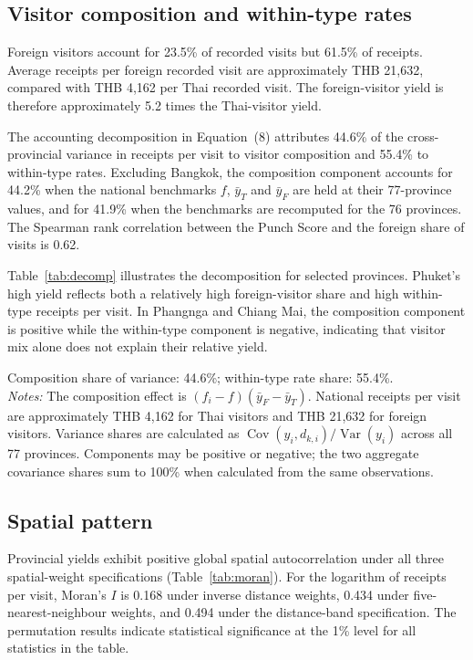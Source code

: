 \documentclass[11pt,a4paper]{article}
\theoremstyle{plain}\newtheorem{proposition}{Proposition}
\theoremstyle{definition}\newtheorem{definition}{Definition}
\begin{document}
\subsection{Visitor composition and within-type rates}
Foreign visitors account for 23.5\% of recorded visits but 61.5\% of receipts. Average receipts per foreign recorded visit are approximately THB 21,632, compared with THB 4,162 per Thai recorded visit. The foreign-visitor yield is therefore approximately 5.2 times the Thai-visitor yield.

The accounting decomposition in Equation~(8) attributes 44.6\% of the cross-provincial variance in receipts per visit to visitor composition and 55.4\% to within-type rates. Excluding Bangkok, the composition component accounts for 44.2\% when the national benchmarks $f$, $\bar y_T$ and $\bar y_F$ are held at their 77-province values, and for 41.9\% when the benchmarks are recomputed for the 76 provinces. The Spearman rank correlation between the Punch Score and the foreign share of visits is 0.62.

Table~\ref{tab:decomp} illustrates the decomposition for selected provinces. Phuket's high yield reflects both a relatively high foreign-visitor share and high within-type receipts per visit. In Phangnga and Chiang Mai, the composition component is positive while the within-type component is negative, indicating that visitor mix alone does not explain their relative yield.

\begin{table}[t]\centering\scriptsize
\caption{Composition and within-type decomposition of receipts per visit for selected provinces, 2024}\label{tab:decomp}
\resizebox{\textwidth}{!}{}\par\smallskip
\parbox{\textwidth}{\scriptsize Composition share of variance: 44.6\%; within-type rate share: 55.4\%.\\
\emph{Notes:} The composition effect is $(f_i-f)(\bar y_F-\bar y_T)$. National receipts per visit are approximately THB 4,162 for Thai visitors and THB 21,632 for foreign visitors. Variance shares are calculated as $\operatorname{Cov}(y_i,d_{k,i})/\operatorname{Var}(y_i)$ across all 77 provinces. Components may be positive or negative; the two aggregate covariance shares sum to 100\% when calculated from the same observations.}
\end{table}

\subsection{Spatial pattern}
Provincial yields exhibit positive global spatial autocorrelation under all three spatial-weight specifications (Table~\ref{tab:moran}). For the logarithm of receipts per visit, Moran's $I$ is 0.168 under inverse distance weights, 0.434 under five-nearest-neighbour weights, and 0.494 under the distance-band specification. The permutation results indicate statistical significance at the 1\% level for all statistics in the table.
\end{document}
